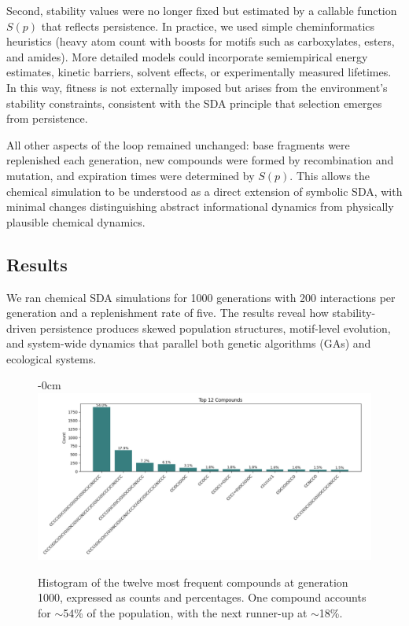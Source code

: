 \documentclass[life,article,submit,pdftex,moreauthors]{Definitions/mdpi}
\begin{document}
Second, stability values were no longer fixed but estimated by a callable function $S(p)$ that reflects persistence. In practice, we used simple cheminformatics heuristics (heavy atom count with boosts for motifs such as carboxylates, esters, and amides). More detailed models could incorporate semiempirical energy estimates, kinetic barriers, solvent effects, or experimentally measured lifetimes. In this way, fitness is not externally imposed but arises from the environment’s stability constraints, consistent with the SDA principle that selection emerges from persistence.

All other aspects of the loop remained unchanged: base fragments were replenished each generation, new compounds were formed by recombination and mutation, and expiration times were determined by $S(p)$. This allows the chemical simulation to be understood as a direct extension of symbolic SDA, with minimal changes distinguishing abstract informational dynamics from physically plausible chemical dynamics.


\subsection{Results}

We ran chemical SDA simulations for 1000 generations with 200 interactions per generation and a replenishment rate of five. The results reveal how stability-driven persistence produces skewed population structures, motif-level evolution, and system-wide dynamics that parallel both genetic algorithms (GAs) and ecological systems.  

\begin{figure}[H]
\begin{adjustwidth}{-\extralength}{0cm}
\centering
\includegraphics[width=\fulllength]{SDA-chem-hist.png}
\end{adjustwidth}
\caption{Histogram of the twelve most frequent compounds at generation 1000, expressed as counts and percentages. One compound accounts for $\sim$54\% of the population, with the next runner-up at $\sim$18\%.}
\label{fig:chem-compound-hist}
\end{figure}
\end{document}
